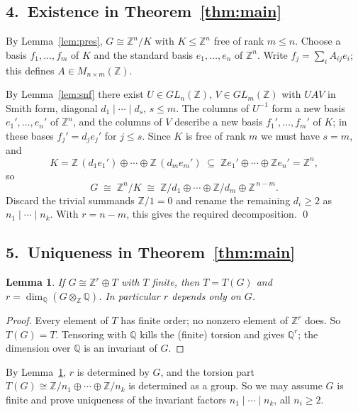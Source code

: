 \documentclass{article}
\newtheorem{lemma}[theorem]{Lemma}
\theoremstyle{definition}
\begin{document}
\subsection*{4.\ Existence in Theorem~\ref{thm:main}}

By Lemma~\ref{lem:pres}, $G\cong\mathbb{Z}^n/K$ with $K\le\mathbb{Z}^n$ free of
rank $m\le n$. Choose a basis $f_1,\dots,f_m$ of $K$ and the
standard basis $e_1,\dots,e_n$ of $\mathbb{Z}^n$. Write
$f_j=\sum_iA_{ij}e_i$; this defines $A\in M_{n\times m}(\mathbb{Z})$.

By Lemma~\ref{lem:snf} there exist $U\in GL_n(\mathbb{Z})$,
$V\in GL_m(\mathbb{Z})$ with $UAV$ in Smith form, diagonal
$d_1\mid\cdots\mid d_s$, $s\le m$. The columns of $U^{-1}$ form a
new basis $e_1',\dots,e_n'$ of $\mathbb{Z}^n$, and the columns of $V$
describe a new basis $f_1',\dots,f_m'$ of $K$; in these bases
$f_j'=d_je_j'$ for $j\le s$. Since $K$ is free of rank $m$ we must
have $s=m$, and
\[
  K=\mathbb{Z}\,(d_1e_1')\oplus\cdots\oplus\mathbb{Z}\,(d_me_m')
  \;\subseteq\;\mathbb{Z} e_1'\oplus\cdots\oplus\mathbb{Z} e_n'=\mathbb{Z}^n,
\]
so
\[
  G\;\cong\;\mathbb{Z}^n/K\;\cong\;
  \mathbb{Z}/d_1\oplus\cdots\oplus\mathbb{Z}/d_m\oplus\mathbb{Z}^{\,n-m}.
\]
Discard the trivial summands $\mathbb{Z}/1=0$ and rename the remaining
$d_i\ge 2$ as $n_1\mid\cdots\mid n_k$. With $r=n-m$, this gives the
required decomposition. \qed

\subsection*{5.\ Uniqueness in Theorem~\ref{thm:main}}

\begin{lemma}\label{lem:rank}
If $G\cong\mathbb{Z}^r\oplus T$ with $T$ finite, then $T=T(G)$ and
$r=\dim_{\mathbb{Q}}(G\otimes_{\mathbb{Z}}\mathbb{Q})$. In particular $r$ depends
only on $G$.
\end{lemma}
\begin{proof}
Every element of $T$ has finite order; no nonzero element of
$\mathbb{Z}^r$ does. So $T(G)=T$. Tensoring with $\mathbb{Q}$ kills the
(finite) torsion and gives $\mathbb{Q}^r$; the dimension over $\mathbb{Q}$ is
an invariant of $G$.
\end{proof}

By Lemma~\ref{lem:rank}, $r$ is determined by $G$, and the torsion
part $T(G)\cong\mathbb{Z}/n_1\oplus\cdots\oplus\mathbb{Z}/n_k$ is determined as
a group. So we may assume $G$ is finite and prove uniqueness of the
invariant factors $n_1\mid\cdots\mid n_k$, all $n_i\ge 2$.
\end{document}
